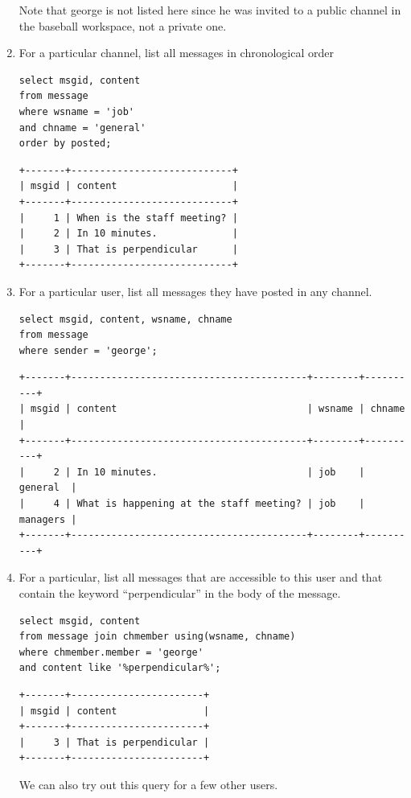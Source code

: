 \documentclass{article}
\begin{document}
\begin{enumerate}
Note that george is not listed here since he was invited to a public channel in the baseball workspace, not a private one.

\item
For a particular channel, list all messages in chronological order
\begin{lstlisting}
select msgid, content
from message
where wsname = 'job'
and chname = 'general'
order by posted;
\end{lstlisting}
\begin{verbatim}
+-------+----------------------------+
| msgid | content                    |
+-------+----------------------------+
|     1 | When is the staff meeting? |
|     2 | In 10 minutes.             |
|     3 | That is perpendicular      |
+-------+----------------------------+
\end{verbatim}

\item
For a particular user, list all messages they have posted in any channel.
\begin{lstlisting}
select msgid, content, wsname, chname
from message
where sender = 'george';
\end{lstlisting}
\begin{verbatim}
+-------+-----------------------------------------+--------+----------+
| msgid | content                                 | wsname | chname   |
+-------+-----------------------------------------+--------+----------+
|     2 | In 10 minutes.                          | job    | general  |
|     4 | What is happening at the staff meeting? | job    | managers |
+-------+-----------------------------------------+--------+----------+
\end{verbatim}

\item
For a particular, list all messages that are accessible to this user and that contain the keyword “perpendicular” in the body of the message.
\begin{lstlisting}
select msgid, content
from message join chmember using(wsname, chname)
where chmember.member = 'george'
and content like '%perpendicular%';
\end{lstlisting}
\begin{verbatim}
+-------+-----------------------+
| msgid | content               |
+-------+-----------------------+
|     3 | That is perpendicular |
+-------+-----------------------+
\end{verbatim}

We can also try out this query for a few other users.


\end{enumerate}
\end{document}
